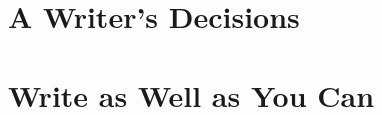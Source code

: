 \documentclass{article}
\begin{document}

\section{A Writer's Decisions}


\section{Write as Well as You Can}


\printbibliography[heading=bibintoc]
\end{document}
